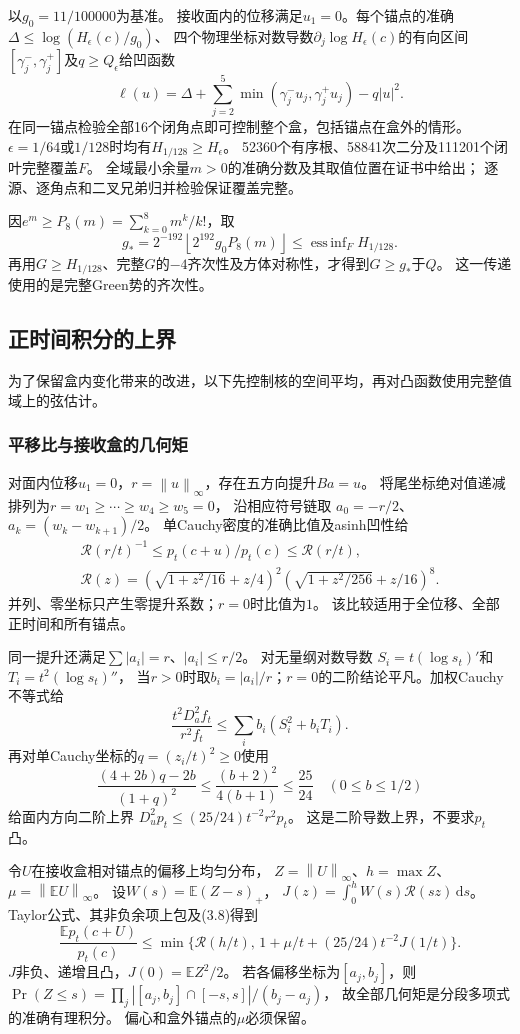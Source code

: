 \documentclass[UTF8,fontset=fandol,zihao=-4,a4paper]{ctexart}
\newcommand{\E}{\mathbb E}
\newcommand{\1}{\mathbf 1}
\newcommand{\dd}{\,\mathrm d}
\newcommand{\norm}[1]{\left\lVert#1\right\rVert}
\DeclareMathOperator{\essinf}{ess\,inf}
\begin{document}
以$g_0=11/100000$为基准。
接收面内的位移满足$u_1=0$。每个锚点的准确$\Delta\le\log(H_\epsilon(c)/g_0)$、
四个物理坐标对数导数$\partial_j\log H_\epsilon(c)$的有向区间
$[\gamma_j^-,\gamma_j^+]$及$q\ge Q_\epsilon$给凹函数
\[
 \ell(u)=\Delta+\sum_{j=2}^5\min(\gamma_j^-u_j,\gamma_j^+u_j)-q|u|^2.
\]
在同一锚点检验全部16个闭角点即可控制整个盒，包括锚点在盒外的情形。
$\epsilon=1/64$或$1/128$时均有$H_{1/128}\ge H_\epsilon$。
52360个有序根、58841次二分及111201个闭叶完整覆盖$F$。
全域最小余量$m>0$的准确分数及其取值位置在证书中给出；
逐源、逐角点和二叉兄弟归并检验保证覆盖完整。

因$e^m\ge P_8(m)=\sum_{k=0}^8m^k/k!$，取
\[
 g_* =2^{-192}\left\lfloor2^{192}g_0P_8(m)\right\rfloor
 \le\essinf_FH_{1/128}.
 \tag{3.7}
\]
再用$G\ge H_{1/128}$、完整$G$的$-4$齐次性及方体对称性，才得到$G\ge g_*$于$Q$。
这一传递使用的是完整Green势的齐次性。

\subsection{正时间积分的上界}
为了保留盒内变化带来的改进，以下先控制核的空间平均，再对凸函数使用完整值域上的弦估计。
\subsubsection{平移比与接收盒的几何矩}
对面内位移$u_1=0$，$r=\norm u_\infty$，存在五方向提升$Ba=u$。
将尾坐标绝对值递减排列为$r=w_1\ge\cdots\ge w_4\ge w_5=0$，
沿相应符号链取
$a_0=-r/2$、$a_k=(w_k-w_{k+1})/2$。
单Cauchy密度的准确比值及asinh凹性给
\[
 \begin{gathered}
 \mathcal R(r/t)^{-1}\le p_t(c+u)/p_t(c)\le\mathcal R(r/t),\\
 \mathcal R(z)=
 (\sqrt{1+z^2/16}+z/4)^2(\sqrt{1+z^2/256}+z/16)^8.
 \end{gathered} \tag{3.8}
\]
并列、零坐标只产生零提升系数；$r=0$时比值为$1$。
该比较适用于全位移、全部正时间和所有锚点。

同一提升还满足$\sum|a_i|=r$、$|a_i|\le r/2$。
对无量纲对数导数 $S_i=t(\log s_t)'$和$T_i=t^2(\log s_t)''$，
当$r>0$时取$b_i=|a_i|/r$；$r=0$的二阶结论平凡。加权Cauchy不等式给
\[
 \frac{t^2D_a^2f_t}{r^2f_t}
 \le\sum_i b_i(S_i^2+b_iT_i).
\]
再对单Cauchy坐标的$q=(z_i/t)^2\ge0$使用
\[
 \frac{(4+2b)q-2b}{(1+q)^2}\le\frac{(b+2)^2}{4(b+1)}
 \le\frac{25}{24}\quad(0\le b\le1/2)
\]
给面内方向二阶上界
$D_u^2p_t\le(25/24)t^{-2}r^2p_t$。
这是二阶导数上界，不要求$p_t$凸。

令$U$在接收盒相对锚点的偏移上均匀分布，
$Z=\norm U_\infty$、$h=\max Z$、$\mu=\norm{\E U}_\infty$。
设$W(s)=\E(Z-s)_+$，
$J(z)=\int_0^hW(s)\mathcal R(sz)\dd s$。
Taylor公式、其非负余项上包及(3.8)得到
\[
 \frac{\E p_t(c+U)}{p_t(c)}
 \le\min\{\mathcal R(h/t),\,1+\mu/t+(25/24)t^{-2}J(1/t)\}. \tag{3.9}
\]
$J$非负、递增且凸，$J(0)=\E Z^2/2$。
若各偏移坐标为$[a_j,b_j]$，则
$\Pr(Z\le s)=\prod_j|[a_j,b_j]\cap[-s,s]|/(b_j-a_j)$，
故全部几何矩是分段多项式的准确有理积分。
偏心和盒外锚点的$\mu$必须保留。
\end{document}
